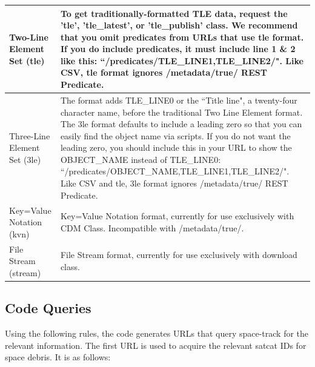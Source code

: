 \documentclass[12pt]{article}
\begin{document}
\begin{table}[H]
\begin{tabular}{|l|p{9cm}|}
		Two-Line Element Set (tle)        & To get traditionally-formatted TLE data, request the 'tle', 'tle\_latest', or 'tle\_publish' class. We recommend that you omit predicates from URLs that use tle format. If you do include predicates, it must include line 1 \& 2 like this: ``/predicates/TLE\_LINE1,TLE\_LINE2/". Like CSV, tle format ignores /metadata/true/ REST Predicate.                                                                                                                                          \\ \hline
		Three-Line Element Set (3le)      & The format adds TLE\_LINE0 or the ``Title line", a twenty-four character name, before the traditional Two Line Element format. The 3le format defaults to include a leading zero so that you can easily find the object name via scripts. If you do not want the leading zero, you should include this in your URL to show the OBJECT\_NAME instead of TLE\_LINE0: ``/predicates/OBJECT\_NAME,TLE\_LINE1,TLE\_LINE2/". Like CSV and tle, 3le format ignores /metadata/true/ REST Predicate. \\ \hline
		Key=Value Notation (kvn)          & Key=Value Notation format, currently for use exclusively with CDM Class. Incompatible with /metadata/true/.                                                                                                                                                                                                                                                                                                                                                                               \\ \hline
		File Stream (stream)              & File Stream format, currently for use exclusively with download class.                                                                                                                                                                                                                                                                                                                                                                                                                    \\ \hline
	\end{tabular}
\end{table}\doublespacing
	
	
	\subsection{Code Queries}
	Using the following rules, the code generates URLs that query space-track for the relevant information. The first URL is used to acquire the relevant satcat IDs for space debris. It is as follows:\par 
	
\end{document}
